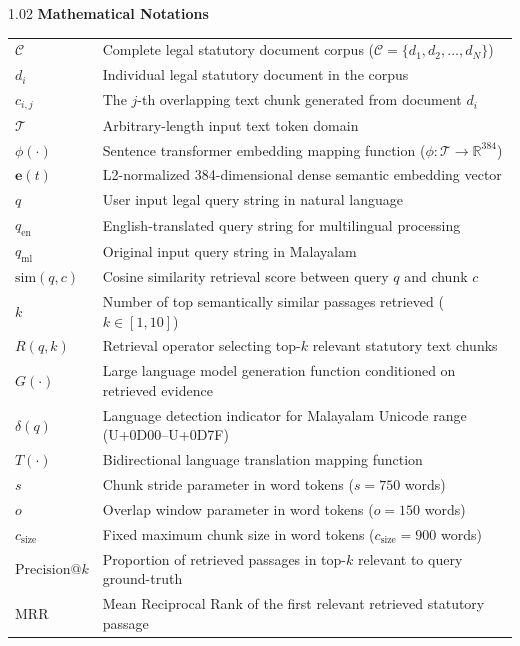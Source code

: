 \begin{spacing}{1.02}
\vspace{6pt}
\noindent \textbf{Mathematical Notations}
\nopagebreak[4]
\vspace{4pt}
\nopagebreak[4]

\noindent\begin{tabular*}{\textwidth}{@{\extracolsep{\fill}}p{2.8cm} p{11.2cm}@{}}
$\mathcal{C}$ & Complete legal statutory document corpus ($\mathcal{C} = \{d_1, d_2, \dots, d_N\}$) \\
$d_i$ & Individual legal statutory document in the corpus \\
$c_{i, j}$ & The $j$-th overlapping text chunk generated from document $d_i$ \\
$\mathcal{T}$ & Arbitrary-length input text token domain \\
$\phi(\cdot)$ & Sentence transformer embedding mapping function ($\phi: \mathcal{T} \to \mathbb{R}^{384}$) \\
$\mathbf{e}(t)$ & L2-normalized 384-dimensional dense semantic embedding vector \\
$q$ & User input legal query string in natural language \\
$q_{\text{en}}$ & English-translated query string for multilingual processing \\
$q_{\text{ml}}$ & Original input query string in Malayalam \\
$\text{sim}(q, c)$ & Cosine similarity retrieval score between query $q$ and chunk $c$ \\
$k$ & Number of top semantically similar passages retrieved ($k \in [1, 10]$) \\
$R(q, k)$ & Retrieval operator selecting top-$k$ relevant statutory text chunks \\
$G(\cdot)$ & Large language model generation function conditioned on retrieved evidence \\
$\delta(q)$ & Language detection indicator for Malayalam Unicode range (U+0D00--U+0D7F) \\
$T(\cdot)$ & Bidirectional language translation mapping function \\
$s$ & Chunk stride parameter in word tokens ($s = 750$ words) \\
$o$ & Overlap window parameter in word tokens ($o = 150$ words) \\
$c_{\text{size}}$ & Fixed maximum chunk size in word tokens ($c_{\text{size}} = 900$ words) \\
$\text{Precision}@k$ & Proportion of retrieved passages in top-$k$ relevant to query ground-truth \\
$\text{MRR}$ & Mean Reciprocal Rank of the first relevant retrieved statutory passage \\
\end{tabular*}
\end{spacing}

\thispagestyle{plain}
